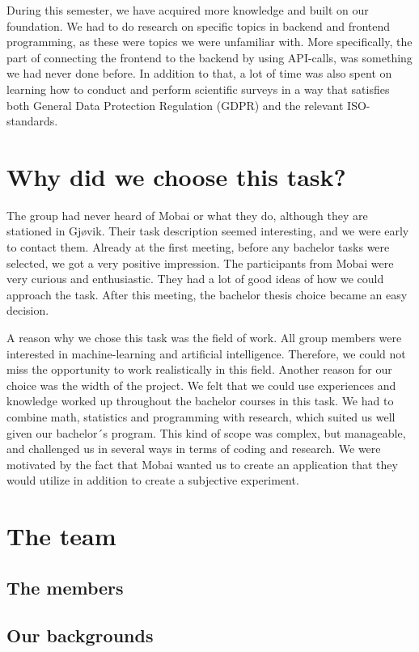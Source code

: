 During this semester, we have acquired more knowledge and built on our foundation. We had to do research on specific topics in backend and frontend programming, as these were topics we were unfamiliar with. More specifically, the part of connecting the frontend to the backend by using API-calls, was something we had never done before. In addition to that, a lot of time was also spent on learning how to conduct and perform scientific surveys in a way that satisfies both General Data Protection Regulation (GDPR) and the relevant ISO-standards.  

\section{Why did we choose this task?}
The group had never heard of Mobai or what they do, although they are stationed in Gjøvik. Their task description seemed interesting, and we were early to contact them. Already at the first meeting, before any bachelor tasks were selected, we got a very positive impression. The participants from Mobai were very curious and enthusiastic. They had a lot of good ideas of how we could approach the task. After this meeting, the bachelor thesis choice became an easy decision. 

A reason why we chose this task was the field of work. All group members were interested in machine-learning and artificial intelligence. Therefore, we could not miss the opportunity to work realistically in this field. Another reason for our choice was the width of the project. We felt that we could use experiences and knowledge worked up throughout the bachelor courses in this task. We had to combine math, statistics and programming with research, which suited us well given our bachelor´s program. This kind of scope was complex, but manageable, and challenged us in several ways in terms of coding and research. We were motivated by the fact that Mobai wanted us to create an application that they would utilize in addition to create a subjective experiment.   

\section{The team}

\subsection{The members}

\subsection{Our backgrounds}

